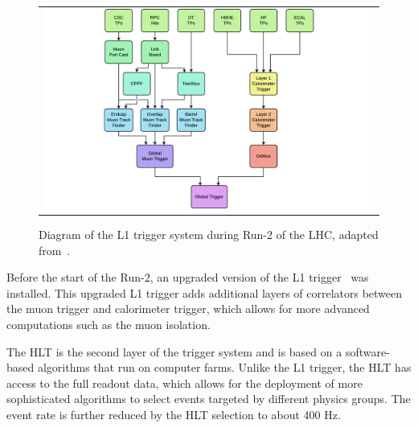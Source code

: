 \begin{figure}[tbh!]
 \begin{center}
 \begin{tabular}{c}
 \includegraphics[width=1\textwidth]{figures/Part2/CMS/L1T}
 \end{tabular}
 \caption{Diagram of the \ac{L1} trigger system during Run-2 of the \ac{LHC}, adapted from~\cite{CMS:2020cmk}.}
 \label{fig:L1T}
 \end{center}
\end{figure}

Before the start of the Run-2, an upgraded version of the \ac{L1} trigger~\cite{Tapper:2013yva} was installed. This upgraded \ac{L1} trigger adds additional layers of correlators between the muon trigger and calorimeter trigger, which allows for more advanced computations such as the muon isolation. 

The \ac{HLT} is the second layer of the trigger system and is based on a software-based algorithms that run on computer farms. Unlike the \ac{L1} trigger, the \ac{HLT} has access to the full readout data, which allows for the deployment of more sophisticated algorithms to select events targeted by different physics groups. The event rate is further reduced by the \ac{HLT} selection to about 400 Hz.